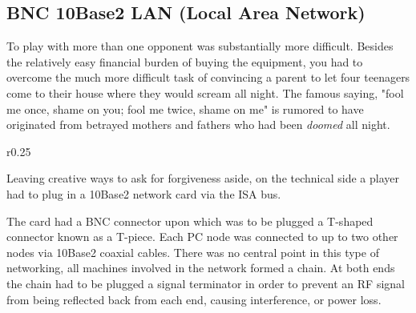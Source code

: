 \subsection{BNC 10Base2 LAN (Local Area Network)}
To play with more than one opponent was substantially more difficult. Besides the relatively easy financial burden of buying the equipment, you had to overcome the much more difficult task of convincing a parent to let four teenagers come to their house where they would scream all night. The famous saying, "fool me once, shame on you; fool me twice, shame on me" is rumored to have originated from betrayed mothers and fathers who had been \textit{doomed} all night.\\
\par



\begin{wrapfigure}[6]{r}{0.25\textwidth}
\centering
{}
\end{wrapfigure}

Leaving creative ways to ask for forgiveness aside, on the technical side a player had to plug in a 10Base2 network card via the ISA bus. \\
\par The card had a BNC connector upon which was to be plugged a T-shaped connector known as a T-piece. Each PC node was connected to up to two other nodes via 10Base2 coaxial cables. There was no central point in this type of networking, all machines involved in the network formed a chain. At both ends the chain had to be plugged a signal terminator in order to prevent an RF signal from being reflected back from each end, causing interference, or power loss.


